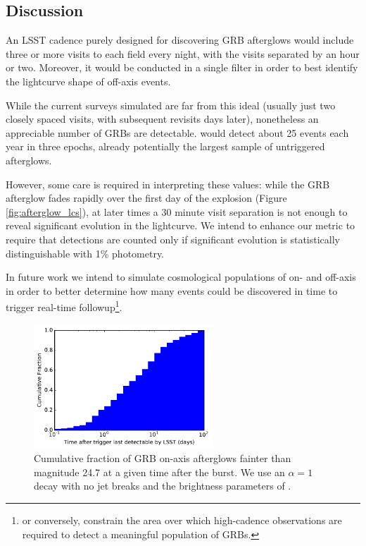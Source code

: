 
\subsection{Discussion}
\label{sec:\secname:discussion}

An LSST cadence purely designed for discovering GRB afterglows would
include three or more visits to each field every night, with the visits
separated by an hour or two. Moreover, it would be conducted in a single
filter in order to best identify the lightcurve shape of off-axis
events.

While the current surveys simulated are far from this ideal
(usually just two closely spaced visits, with subsequent revisits days
later), nonetheless an appreciable number of GRBs are detectable.
 would detect about 25 events each
year in three epochs, already potentially the largest sample of untriggered
afterglows.

However, some care is required in interpreting these values:
while the GRB afterglow fades rapidly over the first day of the explosion
(Figure \ref{fig:afterglow_lcs}), at later times a 30 minute visit
separation is not enough to reveal significant evolution in the lightcurve.
We intend to enhance our metric to require that detections are counted only
if significant evolution is statistically distinguishable with 1\%
photometry.

In future work we intend to simulate cosmological populations of on- and
off-axis in order to better determine how many events could be discovered
in time to trigger real-time followup\footnote{or conversely, 
constrain the area
over which high-cadence observations are required to detect a meaningful
population of GRBs.}.

\begin{figure}[hbt]
\centerline{
\includegraphics[width=0.6\textwidth]{figs/transients/afterglow_cdf.pdf}
}
\caption{ Cumulative fraction of GRB on-axis afterglows fainter than
magnitude 24.7 at a given time after the burst. We use an $\alpha=1$
decay with no jet breaks and the brightness parameters of
\citet{2011PASP..123.1034J}. }
\label{fig:afterglow_visibility}
\end{figure}

